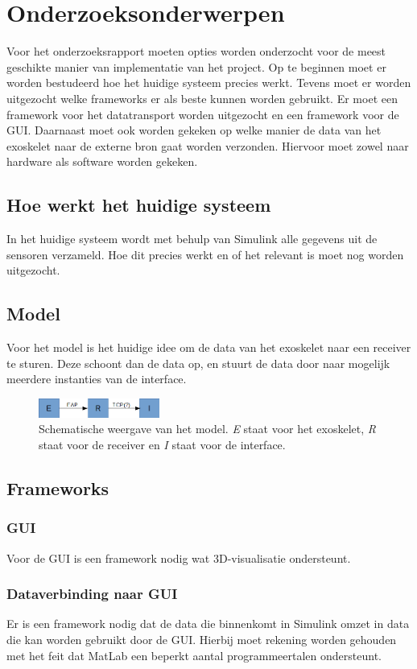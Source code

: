 \section{Onderzoeksonderwerpen}
Voor het onderzoeksrapport moeten opties worden onderzocht voor de meest geschikte manier van implementatie van het project. Op te beginnen moet er worden bestudeerd hoe het huidige systeem precies werkt. Tevens moet er worden uitgezocht welke frameworks er als beste kunnen worden gebruikt. Er moet een framework voor het datatransport worden uitgezocht en een framework voor de GUI. Daarnaast moet ook worden gekeken op welke manier de data van het exoskelet naar de externe bron gaat worden verzonden. Hiervoor moet zowel naar hardware als software worden gekeken.
\subsection{Hoe werkt het huidige systeem}
In het huidige systeem wordt met behulp van Simulink alle gegevens uit de sensoren verzameld. Hoe dit precies werkt en of het relevant is moet nog worden uitgezocht. 
\subsection{Model}
Voor het model is het huidige idee om de data van het exoskelet naar een receiver te sturen. Deze schoont dan de data op, en stuurt de data door naar mogelijk meerdere instanties van de interface.
\begin{figure}[!ht]
	\centering
	\includegraphics[width=150px]{ERIModel}
	\caption{Schematische weergave van het model. \textit{E} staat voor het exoskelet, \textit{R} staat voor de receiver en \textit{I} staat voor de interface.}
\end{figure}
\subsection{Frameworks}
\subsubsection{GUI}
Voor de GUI is een framework nodig wat 3D-visualisatie ondersteunt.
\subsubsection{Dataverbinding naar GUI}
Er is een framework nodig dat de data die binnenkomt in Simulink omzet in data die kan worden gebruikt door de GUI. Hierbij moet rekening worden gehouden met het feit dat MatLab een beperkt aantal programmeertalen ondersteunt.
